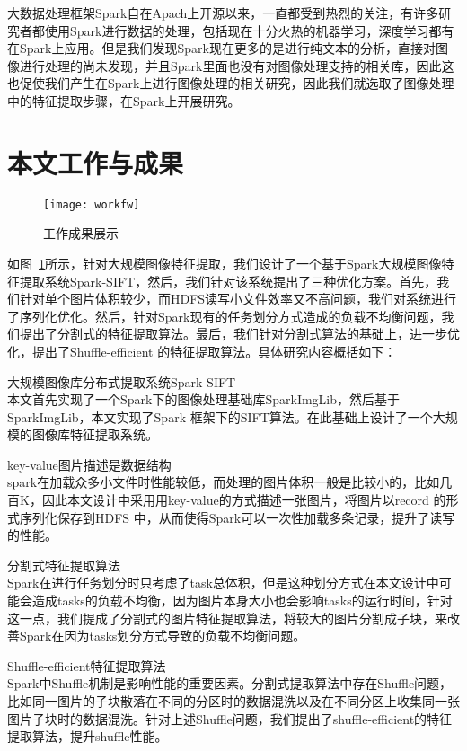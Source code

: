大数据处理框架Spark自在Apach上开源以来，一直都受到热烈的关注，有许多研究者都使用Spark进行数据的处理，包括现在十分火热的机器学习，深度学习都有在Spark上应用。但是我们发现Spark现在更多的是进行纯文本的分析，直接对图像进行处理的尚未发现，并且Spark里面也没有对图像处理支持的相关库，因此这也促使我们产生在Spark上进行图像处理的相关研究，因此我们就选取了图像处理中的特征提取步骤，在Spark上开展研究。

\section{本文工作与成果}
\begin{figure}[htp]
\centering
\texttt{[image: workfw]}
\caption{工作成果展示}
\label{fig:workfw}
\end{figure}
如图~\ref{fig:workfw}所示，针对大规模图像特征提取，我们设计了一个基于Spark大规模图像特征提取系统Spark-SIFT，然后，我们针对该系统提出了三种优化方案。首先，我们针对单个图片体积较少，而HDFS读写小文件效率又不高问题，我们对系统进行了序列化优化。然后，针对Spark现有的任务划分方式造成的负载不均衡问题，我们提出了分割式的特征提取算法。最后，我们针对分割式算法的基础上，进一步优化，提出了Shuffle-efficient 的特征提取算法。具体研究内容概括如下：
\begin{compactenum}
\item 大规模图像库分布式提取系统Spark-SIFT\\本文首先实现了一个Spark下的图像处理基础库SparkImgLib，然后基于SparkImgLib，本文实现了Spark 框架下的SIFT算法。在此基础上设计了一个大规模的图像库特征提取系统。
\item key-value图片描述是数据结构\\spark在加载众多小文件时性能较低，而处理的图片体积一般是比较小的，比如几百K，因此本文设计中采用用key-value的方式描述一张图片，将图片以record 的形式序列化保存到HDFS 中，从而使得Spark可以一次性加载多条记录，提升了读写的性能。
\item 分割式特征提取算法\\Spark在进行任务划分时只考虑了task总体积，但是这种划分方式在本文设计中可能会造成tasks的负载不均衡，因为图片本身大小也会影响tasks的运行时间，针对这一点，我们提成了分割式的图片特征提取算法，将较大的图片分割成子块，来改善Spark在因为tasks划分方式导致的负载不均衡问题。
\item Shuffle-efficient特征提取算法\\Spark中Shuffle机制是影响性能的重要因素。分割式提取算法中存在Shuffle问题，比如同一图片的子块散落在不同的分区时的数据混洗以及在不同分区上收集同一张图片子块时的数据混洗。针对上述Shuffle问题，我们提出了shuffle-efficient的特征提取算法，提升shuffle性能。
\end{compactenum}

